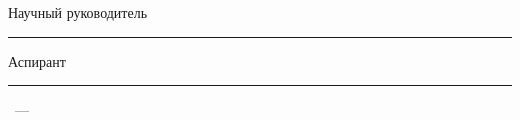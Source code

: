 \begin{flushleft}%
Научный руководитель\hfill  \rule{0.15\linewidth}{.2pt} \supervisorFioShort
\vspace{0pt plus3fill} %

Аспирант\hfill  \rule{0.15\linewidth}{.2pt} \thesisAuthorShort
\end{flushleft}%
%
\vspace{0pt plus4fill} %
\begin{center}%
{\thesisCity~--- \thesisYear}
\end{center}%
\newpage
